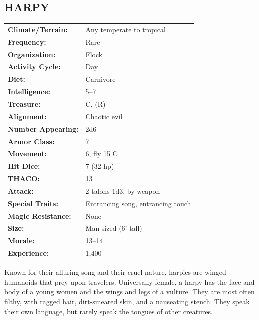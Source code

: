 \begin{multicols}{2}
\noindent \begin{minipage}{\columnwidth}

\vspace{1em}

\subsection{HARPY}

\noindent \begin{tabular}{p{}p{}}
\textbf{Climate/Terrain:}	& Any temperate to tropical \\
\textbf{Frequency:} 		& Rare \\
\textbf{Organization:} 		& Flock \\
\textbf{Activity Cycle:} 	& Day \\
\textbf{Diet:} 				& Carnivore \\
\textbf{Intelligence:} 		& 5--7 \\
\textbf{Treasure:} 			& C, (R) \\
\textbf{Alignment:} 		& Chaotic evil \\
\hline
\textbf{Number Appearing:} 	& 2d6 \\
\textbf{Armor Class:} 		& 7 \\
\textbf{Movement:} 			& 6, fly 15 C \\
\textbf{Hit Dice:} 			& 7 (32 hp) \\
\textbf{THACO:} 			& 13 \\
\textbf{Attack:} 			& 2 talons 1d3, by weapon \\
\textbf{Special Traits:} & Entrancing song, entrancing touch \\
\textbf{Magic Resistance:} 	& None \\
\textbf{Size:} 				& Man-sized (6' tall) \\
\textbf{Morale:} 			& 13--14 \\
\textbf{Experience:} 		& 1,400 \\ %
\end{tabular}

\end{minipage}

Known for their alluring song and their cruel nature, harpies are winged humanoids that prey upon travelers. Universally female, a harpy has the face and body of a young women and the wings and legs of a vulture. They are most often filthy, with ragged hair, dirt-smeared skin, and a nauseating stench. They speak their own language, but rarely speak the tongues of other creatures.


\end{multicols}
